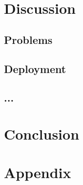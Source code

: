 \documentclass[a4paper]{article}
\begin{document}
\section{Discussion}
\subsection{Problems}
\subsection{Deployment}

\subsection{...}


\section{Conclusion}

\newpage
\section{Appendix}
\end{document}
